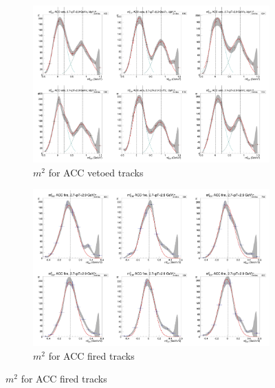 \begin{figure}[H]
  \ContinuedFloat
    \begin{subfigure}{1\textwidth}
    \includegraphics[width=1\textwidth]{hiptfits/neg/PSm2_cent0_ich0_accfire0_ptbin11.jpg}
    \caption{$m^2$ for ACC vetoed tracks}
    \end{subfigure}
    \begin{subfigure}{1\textwidth}
    \includegraphics[width=1\textwidth]{hiptfits/neg/PSm2_cent0_ich0_accfire1_ptbin11.jpg}
    \caption{$m^2$ for ACC fired tracks}
    \end{subfigure}  
\end{figure}
